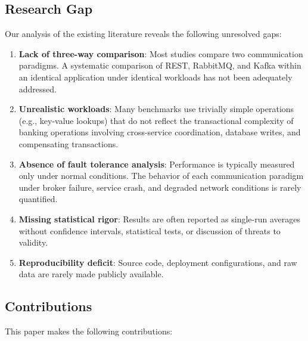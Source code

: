 \documentclass[journal]{IEEEtran}
\begin{document}
\subsection{Research Gap}
\label{subsec:research_gap}

Our analysis of the existing literature reveals the following unresolved gaps:

\begin{enumerate}
    \item \textbf{Lack of three-way comparison}: Most studies compare two communication paradigms. A systematic comparison of REST, RabbitMQ, and Kafka within an identical application under identical workloads has not been adequately addressed.
    \item \textbf{Unrealistic workloads}: Many benchmarks use trivially simple operations (e.g., key-value lookups) that do not reflect the transactional complexity of banking operations involving cross-service coordination, database writes, and compensating transactions.
    \item \textbf{Absence of fault tolerance analysis}: Performance is typically measured only under normal conditions. The behavior of each communication paradigm under broker failure, service crash, and degraded network conditions is rarely quantified.
    \item \textbf{Missing statistical rigor}: Results are often reported as single-run averages without confidence intervals, statistical tests, or discussion of threats to validity.
    \item \textbf{Reproducibility deficit}: Source code, deployment configurations, and raw data are rarely made publicly available.
\end{enumerate}

\subsection{Contributions}
\label{subsec:contributions}

This paper makes the following contributions:
\end{document}
